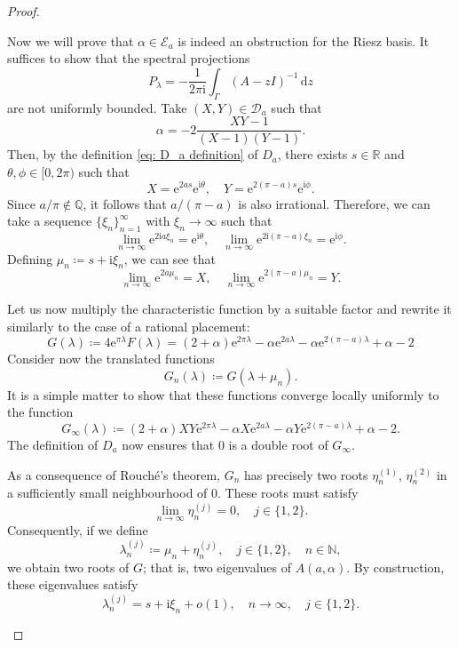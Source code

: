 \documentclass[11pt, a4paper,reqno]{amsart}
\theoremstyle{plain}
\theoremstyle{definition}
\theoremstyle{remark}
\newcommand{\dd}{\,\textrm{d}}
\newcommand{\1}{\mathds 1}
\begin{document}
\begin{proof}
\begin{enumerate}
        Now we will prove that $\alpha \in \mathcal E_a$ is indeed an obstruction for the Riesz basis. It suffices to show that the spectral projections 
        \[
        P_\lambda = - \frac{1}{2\pi \mathrm{i}}\int_\Gamma (A-zI)^{-1}\dd z
        \]
        are not uniformly bounded. Take $(X,Y) \in \mathcal D_a$ such that 
        \[
        \alpha = - 2\frac{XY-1}{(X-1)(Y-1)}.
        \]
        Then, by the definition \eqref{eq: D_a definition} of $D_a$, there exists $s \in \mathbb R$ and $\theta, \phi \in [0,2\pi)$ such that
        \[
        X = \mathrm{e}^{2as}\mathrm{e}^{\mathrm{i}\theta}, \quad Y = \mathrm{e}^{2(\pi-a)s}\mathrm{e}^{\mathrm{i}\phi}.
        \]
        Since $a/\pi \notin \mathbb Q$, it follows that $a/(\pi-a)$ is also irrational. Therefore, we can take a sequence $\{\xi_n\}_{n=1}^{\infty}$ with $\xi_n \to \infty$ such that
        \[
        \lim_{n\to\infty}\mathrm{e}^{2\mathrm{i}a\xi_n}  = \mathrm{e}^{\mathrm{i}\theta}, \quad \lim_{n\to \infty}\mathrm{e}^{2\mathrm{i}(\pi-a)\xi_n} = \mathrm{e}^{\mathrm{i}\phi}.
        \]
        Defining $\mu_n \coloneqq s + \mathrm{i}\xi_n$, we can see that
        \[
        \lim_{n\to\infty}\mathrm{e}^{2a\mu_n} = X, \quad \lim_{n\to\infty}\mathrm{e}^{2(\pi-a)\mu_n} = Y.
        \]

        Let us now multiply the characteristic function by a suitable factor and rewrite it similarly to the case of a rational placement:
        \[
        G(\lambda) \coloneqq 4\mathrm{e}^{\pi\lambda}F(\lambda) = (2+\alpha)\mathrm{e}^{2\pi\lambda} - \alpha \mathrm{e}^{2a\lambda} - \alpha \mathrm{e}^{2(\pi-a)\lambda} + \alpha - 2 
        \]
        Consider now the translated functions
        \[
        G_n(\lambda) \coloneqq G(\lambda + \mu_n).
        \]
        It is a simple matter to show that these functions converge locally uniformly to the function
        \[
        G_\infty(\lambda) \coloneqq (2+\alpha)XY\mathrm{e}^{2\pi\lambda} - \alpha X\mathrm{e}^{2a\lambda} - \alpha Y\mathrm{e}^{2(\pi-a)\lambda} + \alpha - 2.
        \]
        The definition of $D_a$ now ensures that $0$ is a double root of $G_\infty$.

        As a consequence of Rouché's theorem, $G_n$ has precisely two roots $\eta_n^{(1)}$, $\eta_n^{(2)}$ in a sufficiently small neighbourhood of $0$. These roots must satisfy
        \[
        \lim_{n\to\infty}\eta_n^{(j)} = 0, \quad j \in \{1, 2\}.
        \]
        Consequently, if we define
        \[
        \lambda_n^{(j)} \coloneqq \mu_n + \eta_n^{(j)}, \quad j \in \{1, 2\}, \quad n \in \mathbb N,
        \]
        we obtain two roots of $G$; that is, two eigenvalues of $A(a, \alpha)$. By construction, these eigenvalues satisfy
        \[
        \lambda_n^{(j)} = s + \mathrm{i}\xi_n + o(1), \quad n\to \infty, \quad j \in \{1, 2\}.
        \]


\end{enumerate}
\end{proof}
\end{document}
